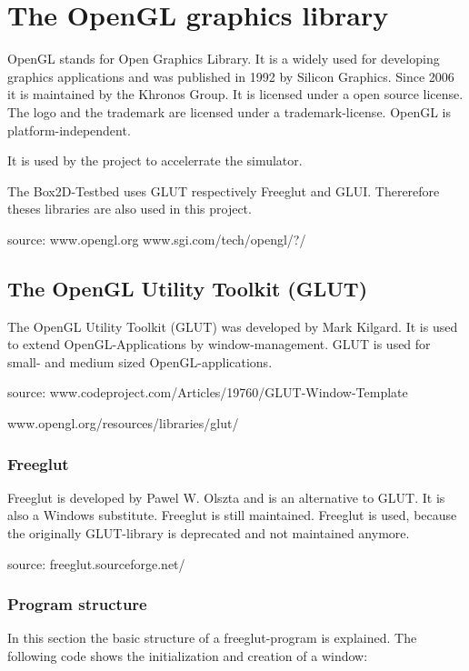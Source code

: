 \documentclass[10pt,a4paper,DIV=11]{scrreprt}
\begin{document}
\chapter{The OpenGL graphics library}
OpenGL stands for Open Graphics Library. It is a widely used for developing graphics applications and was published in 1992 by Silicon Graphics. Since 2006 it is maintained by the Khronos Group. It is licensed under a open source license. The logo and the trademark are licensed under a trademark-license.
OpenGL is platform-independent.


It is used by the project to accelerrate the simulator.

The Box2D-Testbed uses GLUT respectively Freeglut and GLUI. Thererefore theses libraries are also used in this project.

source: www.opengl.org
www.sgi.com/tech/opengl/?/


\section{The OpenGL Utility Toolkit (GLUT)}
The OpenGL Utility Toolkit (GLUT) was developed by Mark Kilgard. It is used to extend OpenGL-Applications by window-management. GLUT is used for small- and medium sized OpenGL-applications.

source: www.codeproject.com/Articles/19760/GLUT-Window-Template

www.opengl.org/resources/libraries/glut/

\subsection{Freeglut}
Freeglut is developed by Pawel W. Olszta and is an alternative to GLUT. It is also a Windows substitute. Freeglut is still maintained. Freeglut is used, because the originally GLUT-library is deprecated and not maintained anymore.

source: freeglut.sourceforge.net/

\subsection{Program structure}
In this section the basic structure of a freeglut-program is explained.
The following code shows the initialization and creation of a window:
\end{document}
